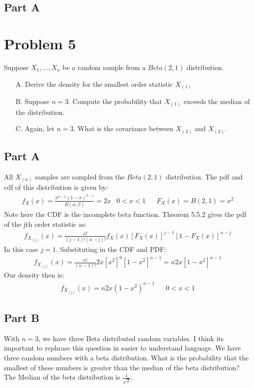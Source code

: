 \documentclass{article}
\begin{document}
\subsection*{Part A}



\clearpage
\section*{Problem 5}
Suppose $X_1,...,X_n$ be a random sample from a $Beta(2,1)$ distribution.
\begin{enumerate}
\item[A.] Derive the density for the smallest order statistic $X_{(1)}$
\item[B.] Suppose $n = 3$. Compute the probability that $X_{(1)}$ exceeds the median of the distribution.
\item[C.] Again, let $n = 3$. What is the covariance between $X_{(2)}$ and $X_{(3)}$.

\end{enumerate}

\subsection*{Part A}
All $X_{(n)}$ samples are sampled from the $Beta(2,1)$ distribution. The pdf and cdf of this distribution is given by:
\begin{align*}
f_X(x) = \frac{x^{\alpha-1}(1-x)^{\beta-1}}{B(\alpha,\beta)} = 2x & 0<x<1 && F_X(x) = B(2,1) = x^2
\end{align*}
Note here the CDF is the incomplete beta function. Theorem 5.5.2 gives the pdf of the jth order statistic as:
\begin{align*}
f_{X_{(j)}}(x) = \frac{n!}{(j-1)!(n-j)!} f_X(x) [F_X(x)]^{j-1} [1-F_X(x)]^{n-j}
\end{align*}
In this case $j=1$. Substituting in the CDF and PDF:
\begin{align*}
f_{X_{(j)}}(x) = \frac{n!}{(n-1)!} 2x [x^2]^{0} [1-x^2]^{n-1} = n 2x [1-x^2]^{n-1}
\end{align*}
Our density then is:
\begin{align*}
\boxed{ f_{X_{(j)}}(x) = n 2x (1-x^2)^{n-1} } && 0<x<1
\end{align*}
\subsection*{Part B}
With $n=3$, we have three Beta distributed random variables. I think its important to rephrase this question in easier to understand language. We have three random numbers with a beta distribution. What is the probability that the smallest of these numbers is greater than the median of the beta distribution? The Median of the beta distribution is $\tfrac{1}{\sqrt{2}}$.
\end{document}
